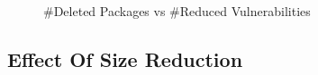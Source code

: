 \documentclass[a4paper,num-refs]{oup-contemporary}
\begin{document}
\begin{figure}[H]
	\caption{\label{deleted}\#Deleted Packages vs \#Reduced Vulnerabilities}
\end{figure}

\subsection{Effect Of Size Reduction}
\end{document}
